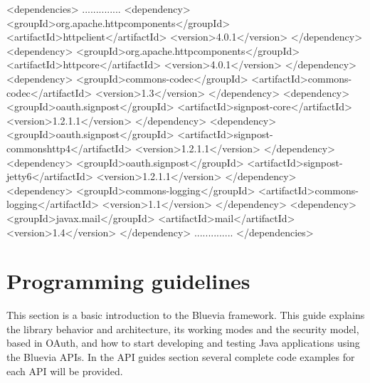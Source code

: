 \begin{DoxyEnumerate}
\begin{DoxyCode}
<dependencies>
..............
        <dependency>    
                <groupId>org.apache.httpcomponents</groupId>
                        <artifactId>httpclient</artifactId>
                        <version>4.0.1</version>
                </dependency>
                <dependency>    
                        <groupId>org.apache.httpcomponents</groupId>
                        <artifactId>httpcore</artifactId>
                        <version>4.0.1</version>
                </dependency>
                <dependency>
                    <groupId>commons-codec</groupId>
                    <artifactId>commons-codec</artifactId>
                    <version>1.3</version>
                </dependency>
                <dependency>
                        <groupId>oauth.signpost</groupId>
                        <artifactId>signpost-core</artifactId>
                        <version>1.2.1.1</version>
                </dependency>
                <dependency>
                        <groupId>oauth.signpost</groupId>
                        <artifactId>signpost-commonshttp4</artifactId>
                        <version>1.2.1.1</version>
                </dependency>
                <dependency>
                        <groupId>oauth.signpost</groupId>
                        <artifactId>signpost-jetty6</artifactId>
                        <version>1.2.1.1</version>
                </dependency>
                <dependency>
                        <groupId>commons-logging</groupId>
                        <artifactId>commons-logging</artifactId>
                        <version>1.1</version>
                </dependency>
                <dependency>
                        <groupId>javax.mail</groupId>
                        <artifactId>mail</artifactId>
                        <version>1.4</version>
                </dependency>
..............
</dependencies>
\end{DoxyCode}
  
\end{DoxyEnumerate}\hypertarget{main_programming_guidelines_sec}{}\section{Programming guidelines}\label{main_programming_guidelines_sec}
This section is a basic introduction to the Bluevia framework. This guide explains the library behavior and architecture, its working modes and the security model, based in OAuth, and how to start developing and testing Java applications using the Bluevia APIs. In the API guides section several complete code examples for each API will be provided.

